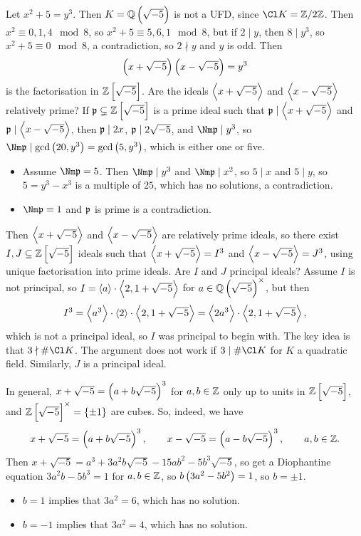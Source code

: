 \begin{example*}
Let $ x^2 + 5 = y^3 $. Then $ K = \QQ\br{\sqrt{-5}} $ is not a UFD, since $ \Cl K = \ZZ / 2\ZZ $. Then $ x^2 \equiv 0, 1, 4 \mod 8 $, so $ x^2 + 5 \equiv 5, 6, 1 \mod 8 $, but if $ 2 \mid y $, then $ 8 \mid y^3 $, so $ x^2 + 5 \equiv 0 \mod 8 $, a contradiction, so $ 2 \nmid y $ and $ y $ is odd. Then
$$ \br{x + \sqrt{-5}}\br{x - \sqrt{-5}} = y^3 $$
is the factorisation in $ \ZZ\sbr{\sqrt{-5}} $. Are the ideals $ \left\langle x + \sqrt{-5} \right\rangle $ and $ \left\langle x - \sqrt{-5} \right\rangle $ relatively prime? If $ \ppp \subsetneq \ZZ\sbr{\sqrt{-5}} $ is a prime ideal such that $ \mathfrak{p} \mid \left\langle x + \sqrt{-5} \right\rangle $ and $ \mathfrak{p} \mid \left\langle x - \sqrt{-5} \right\rangle $, then $ \mathfrak{p} \mid 2x $, $ \mathfrak{p} \mid 2\sqrt{-5} $, and $ \Nm \ppp \mid y^3 $, so $ \Nm \ppp \mid \gcd\br{20, y^3} = \gcd\br{5, y^3} $, which is either one or five.
\begin{itemize}
\item Assume $ \Nm \ppp = 5 $. Then $ \Nm \ppp \mid y^3 $ and $ \Nm \ppp \mid x^2 $, so $ 5 \mid x $ and $ 5 \mid y $, so $ 5 = y^3 - x^3 $ is a multiple of $ 25 $, which has no solutions, a contradiction.
\item $ \Nm \ppp = 1 $ and $ \mathfrak{p} $ is prime is a contradiction.
\end{itemize}
Then $ \left\langle x + \sqrt{-5} \right\rangle $ and $ \left\langle x - \sqrt{-5} \right\rangle $ are relatively prime ideals, so there exist $ I, J \subseteq \ZZ\sbr{\sqrt{-5}} $ ideals such that $ \left\langle x + \sqrt{-5} \right\rangle = I^3 $ and $ \left\langle x - \sqrt{-5} \right\rangle = J^3 $, using unique factorisation into prime ideals. Are $ I $ and $ J $ principal ideals? Assume $ I $ is not principal, so $ I = \left\langle a \right\rangle \cdot \left\langle 2, 1 + \sqrt{-5} \right\rangle $ for $ a \in \QQ\br{\sqrt{-5}}^\times $, but then
$$ I^3 = \left\langle a^3 \right\rangle \cdot \left\langle 2 \right\rangle \cdot \left\langle 2, 1 + \sqrt{-5} \right\rangle = \left\langle 2a^3 \right\rangle \cdot \left\langle 2, 1 + \sqrt{-5} \right\rangle, $$
which is not a principal ideal, so $ I $ was principal to begin with. The key idea is that $ 3 \nmid \#\Cl K $. The argument does not work if $ 3 \mid \#\Cl K $ for $ K $ a quadratic field. Similarly, $ J $ is a principal ideal.

\pagebreak

In general, $ x + \sqrt{-5} = \br{a + b\sqrt{-5}}^3 $ for $ a, b \in \mathbb{Z} $ only up to units in $ \ZZ\sbr{\sqrt{-5}} $, and $ \ZZ\sbr{\sqrt{-5}}^\times = \cbr{\pm 1} $ are cubes. So, indeed, we have
$$ x + \sqrt{-5} = \br{a + b\sqrt{-5}}^3, \qquad x - \sqrt{-5} = \br{a - b\sqrt{-5}}^3, \qquad a, b \in \ZZ. $$
Then $ x + \sqrt{-5} = a^3 + 3a^2b\sqrt{-5} - 15ab^2 - 5b^3\sqrt{-5} $, so get a Diophantine equation $ 3a^2b - 5b^3 = 1 $ for $ a, b \in \mathbb{Z} $, so $ b\br{3a^2 - 5b^2} = 1 $, so $ b = \pm 1 $.
\begin{itemize}
\item $ b = 1 $ implies that $ 3a^2 = 6 $, which has no solution.
\item $ b = -1 $ implies that $ 3a^2 = 4 $, which has no solution.
\end{itemize}
\end{example*}

